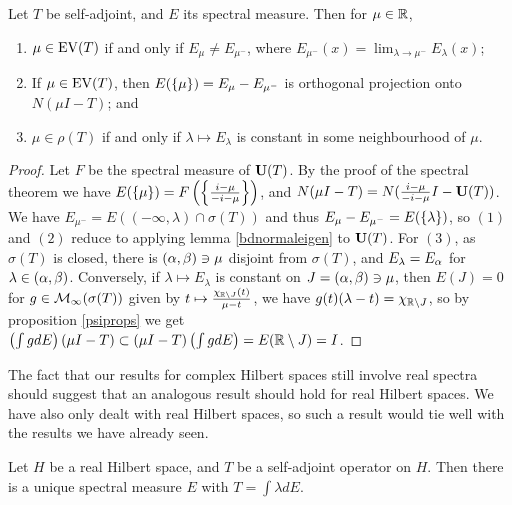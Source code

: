 \documentclass[10pt]{amsart}
\begin{document}
\begin{theorem}\label{eigenvaldecomp}
    Let $T$ be self-adjoint, and $E$ its spectral measure. Then for $\mu \in \mathbb{R}$,
    \begin{enumerate}
        \item $\mu \in \operatorname{EV}(T)$ if and only if $E_\mu \neq E_{\mu^-}$, where $E_{\mu^-}(x) = \lim_{\lambda \to \mu^-}E_\lambda(x)$;
        \item If $\mu \in \operatorname{EV}(T)$, then $E(\left\{  \mu  \right\}) = E_\mu - E_{\mu^-}$ is orthogonal projection onto $N(\mu I - T)$; and
        \item $\mu \in \rho(T)$ if and only if $\lambda \mapsto E_\lambda$ is constant in some neighbourhood of $\mu$.
    \end{enumerate}
\end{theorem}
\begin{proof}
    Let $F$ be the spectral measure of $\mathbf{U}(T)$. By the proof of the spectral theorem we have $E(\left\{  \mu  \right\}) = F\left(  \left\{  \frac{i - \mu}{-i - \mu}  \right\}  \right)$, and $N(\mu I - T) = N(\frac{i - \mu}{-i - \mu}I - \mathbf{U}(T))$. We have $E_{\mu^-} = E((-\infty, \lambda) \cap \sigma(T))$ and thus $E_{\mu} - E_{\mu^-} = E(\left\{  \lambda  \right\})$, so $(1)$ and $(2)$ reduce to applying lemma \ref{bdnormaleigen} to $\mathbf{U}(T)$. For $(3)$, as $\sigma(T)$ is closed, there is $(\alpha, \beta) \ni \mu$ disjoint from $\sigma(T)$, and $E_\lambda = E_\alpha$ for $\lambda \in (\alpha, \beta)$. Conversely, if $\lambda \mapsto E_\lambda$ is constant on $J = (\alpha, \beta) \ni \mu$, then $E(J) = 0$ for $g \in \mathcal{M}_\infty(\sigma(T))$ given by $t \mapsto \frac{\chi_{\mathbb{R} \setminus J}(t)}{\mu - t}$, we have $g(t)(\lambda - t) = \chi_{\mathbb{R} \setminus J}$, so by proposition \ref{psiprops} we get $\left(  \int g dE  \right)(\mu I - T) \subset (\mu I - T)\left(  \int g dE  \right) = E(\mathbb{R} \setminus J) = I$.
\end{proof}
The fact that our results for complex Hilbert spaces still involve real spectra should suggest that an analogous result should hold for real Hilbert spaces. We have also only dealt with real Hilbert spaces, so such a result would tie well with the results we have already seen.
\begin{theorem}
    Let $H$ be a real Hilbert space, and $T$ be a self-adjoint operator on $H$. Then there is a unique spectral measure $E$ with $T = \int \lambda dE$.
\end{theorem}
\end{document}
